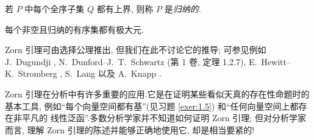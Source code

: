 若 $P$ 中每个全序子集 $Q$ 都有上界, 则称 $P$ 是\emph{归纳的}.

\begin{keylemma}[Zorn]
\label{lem:1.1}
每个非空且归纳的有序集都有极大元.
\end{keylemma}

Zorn 引理可由选择公理推出, 但我们在此不讨论它的推导; 可参见例如 J.~Dugundji
, N.~Dunford--J.~T.~Schwartz  (第 1 卷,
定理 1.2.7), E.~Hewitt--K.~Stromberg , S.~Lang 
以及 A.~Knapp .

\begin{remark}
\label{rem:1.1}
Zorn 引理在分析中有许多重要的应用.它是在证明某些看似天真的存在性命题时的基本工具,
例如``每个向量空间都有基''(见习题  \ref{exer:1.5}) 和``任何向量空间上都存在非平凡的
线性泛函''.多数分析学家并不知道如何证明 Zorn 引理; 但对分析学家而言,
理解 Zorn 引理的陈述并能够正确地使用它, 却是相当要紧的!
\end{remark}

